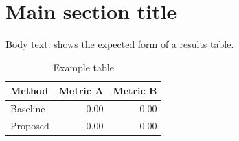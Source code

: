 
\section{Main section title}
\label{sec:body}

Body text.  shows the expected form of a results table.

\begin{table}[H]
\centering
\caption[Example table]{Example table}
\label{tab:example}
\begin{tabular}{lrr}
\toprule
Method & Metric A & Metric B \\
\midrule
Baseline & 0.00 & 0.00 \\
Proposed & 0.00 & 0.00 \\
\bottomrule
\end{tabular}
\end{table}
